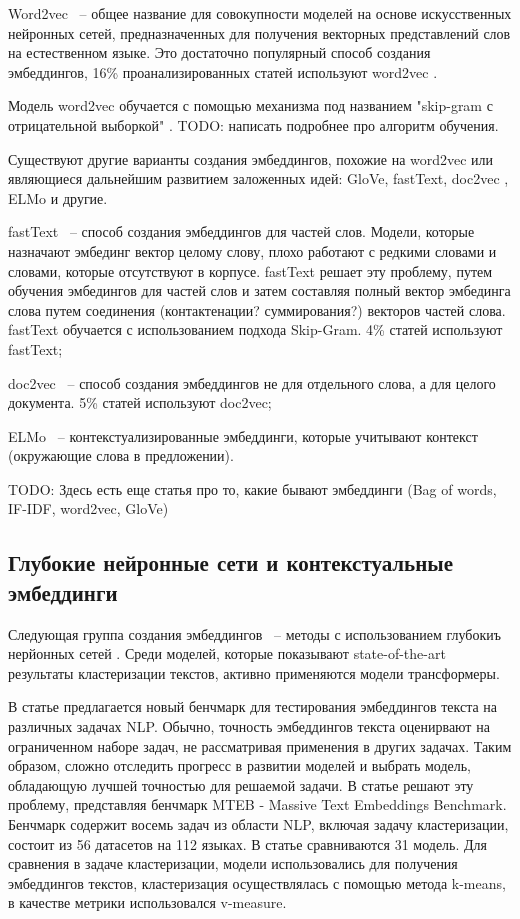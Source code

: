 Word2vec ~-- общее название для совокупности моделей на основе искусственных нейронных сетей, предназначенных для получения векторных представлений слов на естественном языке. Это достаточно популярный способ создания эмбеддингов, 16\% проанализированных статей используют word2vec \cite{no-patterns}.

Модель word2vec обучается с помощью механизма под названием "skip-gram с отрицательной выборкой" \cite{word2vec-habr}. TODO: написать подробнее про алгоритм обучения.

Существуют другие варианты создания эмбеддингов, похожие на word2vec или являющиеся дальнейшим развитием заложенных идей: GloVe, fastText, doc2vec \cite{no-patterns}, ELMo и другие.

fastText ~-- способ создания эмбеддингов для частей слов. Модели, которые назначают эмбединг вектор целому слову, плохо работают с редкими словами  и словами, которые отсутствуют в корпусе. fastText решает эту проблему, путем обучения эмбедингов для частей слов и затем составляя полный вектор эмбединга слова путем соединения (контактенации? суммирования?) векторов частей слова. fastText обучается с использованием подхода Skip-Gram. 4\% статей \cite{no-patterns} используют fastText;

doc2vec ~-- способ создания эмбеддингов не для отдельного слова, а для целого документа. 5\% статей \cite{no-patterns} используют doc2vec;

ELMo ~-- контекстуализированные эмбеддинги, которые учитывают контекст (окружающие слова в предложении).

TODO: Здесь \cite{embeddings-habr} есть еще статья про то, какие бывают эмбеддинги (Bag of words, IF-IDF, word2vec, GloVe)

\subsection{Глубокие нейронные сети и контекстуальные эмбеддинги}

Следующая группа создания эмбеддингов ~-- методы с использованием глубокиъ нерйонных сетей \cite{no-patterns}. Среди моделей, которые показывают state-of-the-art результаты кластеризации текстов, активно применяются модели трансформеры.

В статье \cite{mteb} предлагается новый бенчмарк для тестирования эмбеддингов текста на различных задачах NLP. Обычно, точность эмбеддингов текста оценирвают на ограниченном наборе задач, не рассматривая применения в других задачах. Таким образом, сложно отследить прогресс в развитии моделей и выбрать модель, обладающую лучшей  точностью для решаемой задачи. В статье решают эту проблему, представляя бенчмарк MTEB - Massive Text Embeddings Benchmark. Бенчмарк содержит восемь задач из области NLP, включая задачу кластеризации, состоит из 56 датасетов на 112 языках. В статье сравниваются 31 модель. Для сравнения в задаче кластеризации, модели использовались для получения эмбеддингов текстов, кластеризация осуществлялась с помощью метода k-means, в качестве метрики использовался v-measure.

